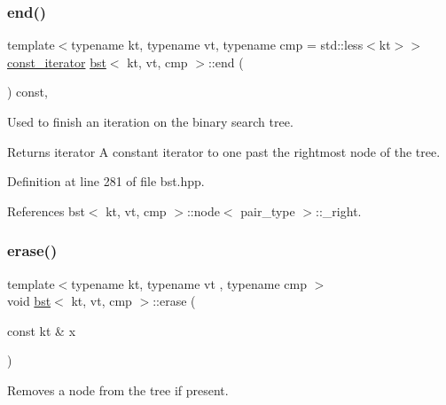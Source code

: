 \mbox{\label{classbst_aa9fa40cf0781035f180aa56d15f0e2d1}} 
\subsubsection{\texorpdfstring{end()}{end()}\hspace{0.1cm}{\footnotesize\ttfamily [2/2]}}
{\footnotesize\ttfamily template$<$typename kt, typename vt, typename cmp = std\+::less$<$kt$>$$>$ \\
\hyperlink{classbst_a72485696d999bf489c6156f6327a2163}{const\+\_\+iterator} \hyperlink{classbst}{bst}$<$ kt, vt, cmp $>$\+::end (\begin{DoxyParamCaption}{ }\end{DoxyParamCaption}) const\hspace{0.3cm}{\ttfamily [inline]}, {\ttfamily [noexcept]}}



Used to finish an iteration on the binary search tree. 

\begin{DoxyReturn}{Returns}
iterator A constant iterator to one past the rightmost node of the tree. 
\end{DoxyReturn}


Definition at line 281 of file bst.\+hpp.



References bst$<$ kt, vt, cmp $>$\+::node$<$ pair\+\_\+type $>$\+::\+\_\+right.

\mbox{\label{classbst_af5ed588b2c686b3b53a2b5466a617f73}} 
\subsubsection{\texorpdfstring{erase()}{erase()}}
{\footnotesize\ttfamily template$<$typename kt, typename vt , typename cmp $>$ \\
void \hyperlink{classbst}{bst}$<$ kt, vt, cmp $>$\+::erase (\begin{DoxyParamCaption}\item[{const kt \&}]{x }\end{DoxyParamCaption})\hspace{0.3cm}{\ttfamily [noexcept]}}



Removes a node from the tree if present. 


